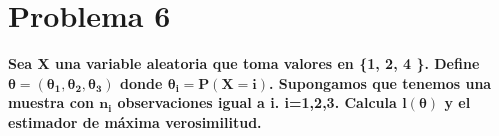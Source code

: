 \section*{Problema 6}

\textbf{Sea X una variable aleatoria que toma valores en \{1, 2, 4 \}. Define $\mathbf{\theta = (\theta_1, \theta_2, \theta_3)}$ donde $\mathbf{\theta_i = P(X=i)}$. Supongamos que tenemos una muestra con $\mathbf{n_i}$ observaciones igual a i. i=1,2,3. Calcula $\mathbf{l(\theta)}$ y el estimador de máxima verosimilitud.}